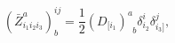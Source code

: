 \begin{equation}
\left( \bar{Z}_{i_{1}i_{2}i_{3}}^{a}\right) _{b}^{ij}=\frac{1}{2}\left(
D_{[i_{1}}\right) _{\;\;b}^{a}\delta _{i_{2}}^{i}\delta _{i_{3}]}^{j},
\label{i14}
\end{equation}

